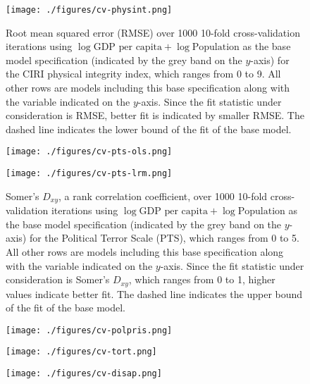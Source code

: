 \documentclass[12pt]{article}
\begin{document}
\begin{figure}[!htpb]
\centering
\texttt{[image: ./figures/cv-physint.png]}
\caption{Root mean squared error (RMSE) over 1000 10-fold cross-validation iterations using $\log \text{GDP per capita} + \log \text{Population}$ as the base model specification (indicated by the grey band on the $y$-axis) for the CIRI physical integrity index, which ranges from 0 to 9. All other rows are models including this base specification along with the variable indicated on the $y$-axis. Since the fit statistic under consideration is RMSE, better fit is indicated by smaller RMSE. The dashed line indicates the lower bound of the fit of the base model.}
\label{cv-physint}
\end{figure}

\begin{figure}[!htpb]
\centering
\texttt{[image: ./figures/cv-pts-ols.png]}
\caption{}
\label{cv-pts-ols}
\end{figure}

\begin{figure}[!htpb]
\centering
\texttt{[image: ./figures/cv-pts-lrm.png]}
\caption{Somer's $D_{xy}$, a rank correlation coefficient, over 1000 10-fold cross-validation iterations using $\log \text{GDP per capita} + \log \text{Population}$ as the base model specification (indicated by the grey band on the $y$-axis) for the Political Terror Scale (PTS), which ranges from 0 to 5. All other rows are models including this base specification along with the variable indicated on the $y$-axis. Since the fit statistic under consideration is Somer's $D_{xy}$, which ranges from 0 to 1, higher values indicate better fit. The dashed line indicates the upper bound of the fit of the base model.}
\label{cv-pts-lrm}
\end{figure}

\begin{figure}[!htpb]
\centering
\texttt{[image: ./figures/cv-polpris.png]}
\caption{}
\label{cv-polpris}
\end{figure}

\begin{figure}[!htpb]
\centering
\texttt{[image: ./figures/cv-tort.png]}
\caption{}
\label{cv-tort}
\end{figure}

\begin{figure}[!htpb]
\centering
\texttt{[image: ./figures/cv-disap.png]}
\caption{}
\label{cv-disap}
\end{figure}
\end{document}
